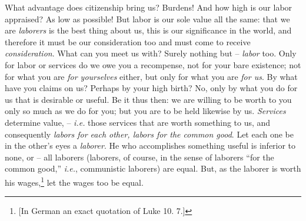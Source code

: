 What advantage does citizenship bring us? Burdens! And how high is our labor 
appraised? As low as possible! But labor is our sole value all the same: that 
we are \textit{laborers} is the best thing about us, this is our significance 
in the world, and therefore it must be our consideration too and must come to 
receive \textit{consideration}. What can you meet us with? Surely nothing but 
-- \textit{labor} too. Only for labor or services do we owe you a recompense, 
not for your bare existence; not for what you are \textit{for yourselves} 
either, but only for what you are \textit{for us}. By what have you claims on 
us? Perhaps by your high birth? No, only by what you do for us that is 
desirable or useful. Be it thus then: we are willing to be worth to you only 
so much as we do for you; but you are to be held likewise by us. 
\textit{Services} determine value, -- \textit{i.e.} those services that are 
worth something to us, and consequently \textit{labors for each other, labors 
for the common good}. Let each one be in the other's eyes a \textit{laborer}. 
He who accomplishes something useful is inferior to none, or -- all laborers 
(laborers, of course, in the sense of laborers ``for the common good,'' 
\textit{i.e.}, communistic laborers) are equal. But, as the laborer is worth 
his wages,\footnote{[In German an exact quotation of Luke 10. 7.]} let the 
wages too be equal.

